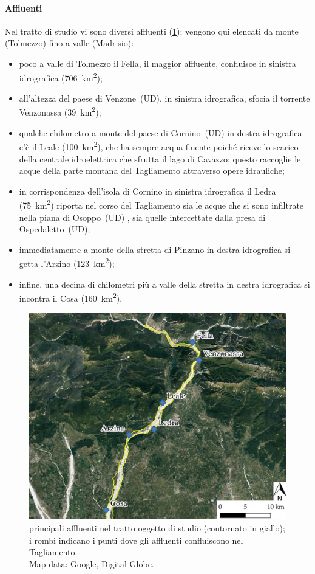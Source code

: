 \paragraph{Affluenti}
Nel tratto di studio vi sono diversi affluenti (\cref{fig:affluenti}); vengono qui elencati da monte (Tolmezzo) fino a valle (Madrisio):
%
\begin{itemize}
	\item poco a valle di Tolmezzo il Fella, il maggior affluente, confluisce in sinistra idrografica (\SI{706}{\kilo\m\tothe{2}});
	\item all'altezza del paese di Venzone~(UD), in sinistra idrografica, sfocia il torrente Venzonassa (\SI{39}{\kilo\m\tothe{2}});
	\item qualche chilometro a monte del paese di Cornino~(UD) in destra idrografica c'è il Leale (\SI{100}{\kilo\m\tothe{2}}), che ha sempre acqua fluente poiché riceve lo scarico della centrale idroelettrica che sfrutta il lago di Cavazzo; questo raccoglie le acque della parte montana del Tagliamento attraverso opere idrauliche;
	\item in corrispondenza dell'isola di Cornino in sinistra idrografica il Ledra (\SI{75}{\kilo\m\tothe{2}}) riporta nel corso del Tagliamento sia le acque che si sono infiltrate nella piana di Osoppo~(UD) , sia quelle intercettate dalla presa di Ospedaletto~(UD);
	\item immediatamente a monte della stretta di Pinzano in destra idrografica si getta l'Arzino (\SI{123}{\kilo\m\tothe{2}});
	\item infine, una decina di chilometri più a valle della stretta in destra idrografica si incontra il Cosa (\SI{160}{\kilo\m\tothe{2}}).
\end{itemize}
%
\begin{figure}
	\centering
	\includegraphics[width=\textwidth]{files/overview_affluenti.jpeg}
	\caption[principali affluenti nel tratto oggetto di studio]{principali affluenti nel tratto oggetto di studio (contornato in giallo); i rombi indicano i punti dove gli affluenti confluiscono nel Tagliamento.
	\\
	Map data: Google, Digital Globe.}
	\label{fig:affluenti}
\end{figure}
